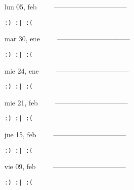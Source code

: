 \documentclass[letterpaper,10pt]{article}
\begin{document}
\begin{multicols}{3}
{lun 05, feb\ \ \ \ \ --------------------------------}
\begin{flushright}\begin{small}\texttt{:) :| :(}\end{small}\end{flushright}
\vfill
{mar 30, ene\ \ \ \ \ --------------------------------}
\begin{flushright}\begin{small}\texttt{:) :| :(}\end{small}\end{flushright}\par
\vfill
{mie 24, ene\ \ \ \ \ --------------------------------}
\begin{flushright}\begin{small}\texttt{:) :| :(}\end{small}\end{flushright}\par
\vfill
\end{multicols}
\vspace{1.05cm}

\begin{multicols}{3}
{mie 21, feb\ \ \ \ \ --------------------------------}
\begin{flushright}\begin{small}\texttt{:) :| :(}\end{small}\end{flushright}
\vfill
{jue 15, feb\ \ \ \ \ --------------------------------}
\begin{flushright}\begin{small}\texttt{:) :| :(}\end{small}\end{flushright}\par
\vfill
{vie 09, feb\ \ \ \ \ --------------------------------}
\begin{flushright}\begin{small}\texttt{:) :| :(}\end{small}\end{flushright}\par
\vfill
\end{multicols}
\vspace{1.05cm}
\end{document}
